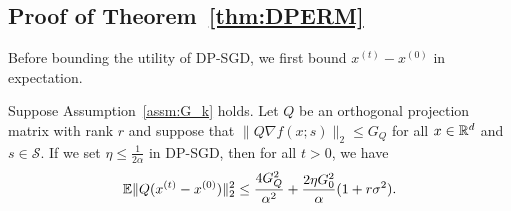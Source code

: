 \subsection{Proof of Theorem~\ref{thm:DPERM}}\label{app:dperm_proof}

Before bounding the utility of DP-SGD, we first bound $x^{(t)}-x^{(0)}$ in expectation.

\begin{lemm}
\label{lem:radius}
Suppose Assumption~\ref{assm:G_k} holds.
Let $Q$ be an orthogonal projection matrix with rank $r$ and suppose that $\|Q\nabla f(x;s)\|_2 \leq G_Q$ for all $x\in\mathbb{R}^d$ and $s \in \mathcal{S}$. 
If we set $\eta\leq\frac{1}{2\alpha}$ in DP-SGD, then for all $t>0$, we have
\[
\mathbb{E}\|Q(x^{(t)}-x^{(0)})\|_2^{2}\leq\frac{4 G_{Q}^{2}}{\alpha^{2}}+\frac{2\eta G_{0}^{2}}{\alpha}(1+r\sigma^{2}).
\]
\end{lemm}


